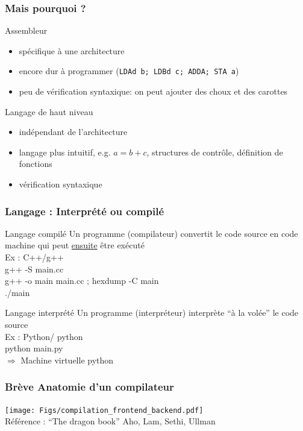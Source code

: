 \documentclass{beamer}
\begin{document}
\begin{frame}
\frametitle{Mais pourquoi ?}

\begin{block}{Assembleur}
\begin{itemize}
\item spécifique à une architecture
\item encore dur à programmer (\texttt{LDAd b; LDBd c; ADDA; STA a})
\item peu de vérification syntaxique: on peut ajouter des choux et des carottes
\end{itemize}
\end{block}
\begin{block}{Langage de haut niveau}
\begin{itemize}
\item indépendant de l'architecture
\item langage plus intuitif, e.g. $a = b + c$, structures de contrôle, définition de fonctions
\item vérification syntaxique
\end{itemize}
\end{block}

\end{frame}

\begin{frame}
\frametitle{Langage : Interprété ou compilé}
\begin{block}{Langage compilé}
Un programme (compilateur) convertit le code source en code machine qui peut \underline{ensuite} être exécuté\\
Ex : C++/g++\\
g++ -S main.cc\\
g++ -o main main.cc ; hexdump -C main\\
./main
\end{block}
\begin{block}{Langage interprété}
Un programme (interpréteur) interprète ``à la volée'' le code source\\
Ex : Python/ python\\
python main.py\\
$\Rightarrow$ Machine virtuelle python
\end{block}
\end{frame}

\begin{frame}
\frametitle{Brève Anatomie d'un compilateur}
\texttt{[image: Figs/compilation\_frontend\_backend.pdf]}\\
\vfill
Référence : ``The dragon book'' Aho, Lam, Sethi, Ullman
\end{frame}
\end{document}
